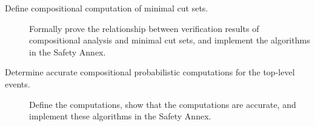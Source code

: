 \begin{description}
\item[Define compositional computation of minimal cut sets.] Formally prove the relationship between verification results of compositional analysis and minimal cut sets, and implement the algorithms in the Safety Annex.

\item[Determine accurate compositional probabilistic computations for the top-level events.] Define the computations, show that the computations are accurate, and implement these algorithms in the Safety Annex.


\end{description}
